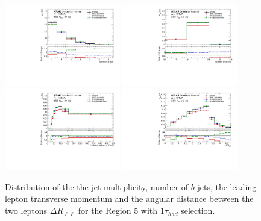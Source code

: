 \begin{figure}[!htb]
\centering
\includegraphics[width=0.45\textwidth]{Plots/ttV/generator/c_Region_4_nJets}
\includegraphics[width=0.45\textwidth]{Plots/ttV/generator/c_Region_4_nBtagJets}\\
\includegraphics[width=0.45\textwidth]{Plots/ttV/generator/c_Region_4_lep_Pt_0} 
\includegraphics[width=0.45\textwidth]{Plots/ttV/generator/c_Region_4_DRll01}\\
  \caption{Distribution of the the jet multiplicity, number of $b$-jets, the leading lepton transverse momentum and the angular distance between the two leptons  $\Delta R _{\ell \ell }$ for the Region 5 with 1$\tau_{had}$ selection. 
   \label{ttV:den_tauR_kin}}
\end{figure}
% 
